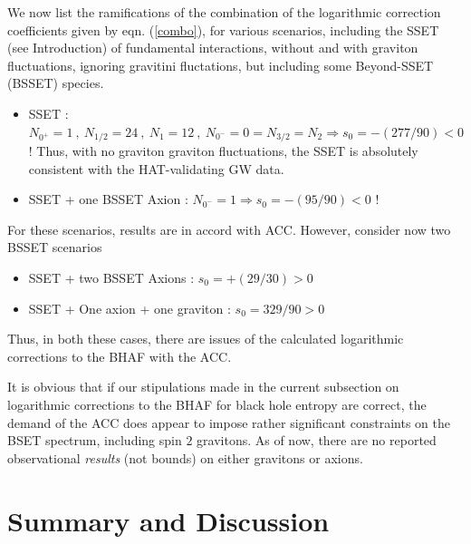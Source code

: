 \documentclass[11pt]{article}
\begin{document}
{We now list the ramifications of the combination of the logarithmic correction coefficients given by eqn. (\ref{combo}), for various scenarios, including the SSET (see Introduction) of fundamental interactions, without and with graviton fluctuations, ignoring gravitini fluctations, but including some  Beyond-SSET (BSSET) species. 
\begin{itemize}
\item  SSET : $N_{0^+} = 1~,~ N_{1/2} =24~,~ N_1=12~,~N_{0^-} =0=N_{3/2}=N_2 \Rightarrow s_0 = -(277/90) < 0$! Thus, with no graviton graviton fluctuations, the SSET is absolutely consistent with the HAT-validating GW data. 
\item SSET + one BSSET Axion : $N_{0^-} = 1 \Rightarrow s_0 = -(95/90) < 0$ !
\end{itemize}
For these scenarios, results are in accord with ACC. However, consider now two BSSET scenarios
\begin{itemize} 
\item SSET + two BSSET Axions : $s_0 = +(29/30) > 0$
\item SSET + One axion + one graviton : $s_0 = 329/90 > 0$ 
\end{itemize}
Thus, in both these cases, there are issues of the calculated logarithmic corrections to the BHAF with the ACC.

It is obvious that if our stipulations made in the current subsection on logarithmic corrections to the BHAF for black hole entropy are correct, the demand of the ACC does appear to impose rather significant constraints on the BSET spectrum, including spin $2$ gravitons. As of now, there are no reported observational {\it results} (not bounds) on either gravitons or axions. 

\section{Summary and Discussion}

}
\end{document}
